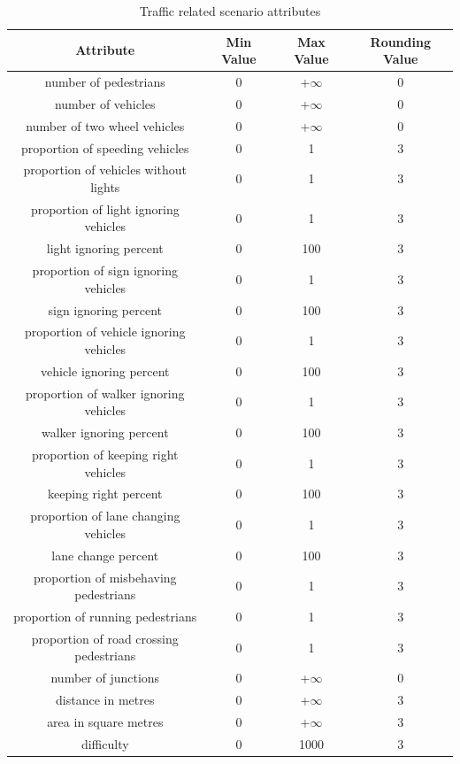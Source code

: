 \begin{table} \label{tab2}
    \centering
    \begin{tabular}{||c c c c||} 
    \hline
 \textbf{Attribute} & \textbf{Min Value} & \textbf{Max Value} & \textbf{Rounding Value} \\ [0.5ex] 
\hline\hline
number of pedestrians & 0 & +$\infty$ & 0 \\
\hline
number of vehicles & 0 & +$\infty$ & 0 \\
\hline
number of two wheel vehicles & 0 & +$\infty$ & 0 \\
\hline
proportion of speeding vehicles & 0 & 1 & 3 \\
\hline
proportion of vehicles without lights & 0 & 1 & 3 \\
\hline
proportion of light ignoring vehicles & 0 & 1 & 3 \\
\hline
light ignoring percent & 0 & 100 & 3 \\
\hline
proportion of sign ignoring vehicles & 0 & 1 & 3 \\
\hline
sign ignoring percent & 0 & 100 & 3 \\
\hline
proportion of vehicle ignoring vehicles & 0 & 1 & 3 \\
\hline
vehicle ignoring percent & 0 & 100 & 3 \\
\hline
proportion of walker ignoring vehicles & 0 & 1 & 3 \\
\hline
walker ignoring percent & 0 & 100 & 3 \\
\hline
proportion of keeping right vehicles & 0 & 1 & 3 \\
\hline
keeping right percent & 0 & 100 & 3 \\
\hline
proportion of lane changing vehicles & 0 & 1 & 3 \\
\hline
lane change percent & 0 & 100 & 3 \\
\hline
proportion of misbehaving pedestrians & 0 & 1 & 3 \\
\hline
proportion of running pedestrians & 0 & 1 & 3 \\
\hline
proportion of road crossing pedestrians & 0 & 1 & 3 \\
\hline
number of junctions & 0 & +$\infty$ & 0 \\
\hline
distance in metres & 0 & +$\infty$ & 3 \\
\hline
area in square metres & 0 & +$\infty$ & 3 \\ [1ex] 
\hline
difficulty & 0 & 1000 & 3 \\ [1ex] 
\hline
    \end{tabular}
    \caption{Traffic related scenario attributes}
    \label{tab:traffic_attributes}
\end{table}


